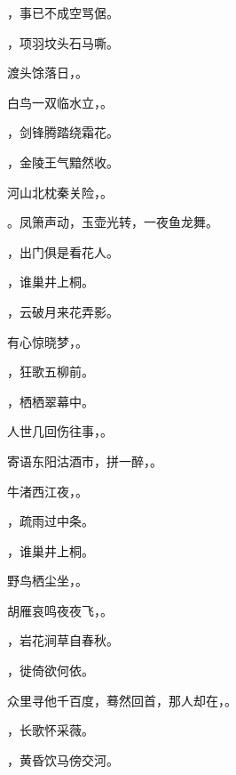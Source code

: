 \documentclass[12pt, a4paper, addpoints]{exam}
\begin{document}
\begin{questions}
\question[1] \uline{\qquad\qquad\qquad}，事已不成空骂倨。

\question[1] \uline{\qquad\qquad\qquad}，项羽坟头石马嘶。

\question[1] 渡头馀落日，\uline{\qquad\qquad\qquad}。

\question[1] 白鸟一双临水立，\uline{\qquad\qquad\qquad}。

\question[1] \uline{\qquad\qquad\qquad}，剑锋腾踏绕霜花。

\question[1] \uline{\qquad\qquad\qquad}，金陵王气黯然收。

\question[1] 河山北枕秦关险，\uline{\qquad\qquad\qquad}。

\question[1] \uline{\qquad\qquad\qquad}。凤箫声动，玉壶光转，一夜鱼龙舞。

\question[1] \uline{\qquad\qquad\qquad}，出门俱是看花人。

\question[1] \uline{\qquad\qquad\qquad}，谁巢井上桐。

\question[1] \uline{\qquad\qquad\qquad}，云破月来花弄影。

\question[1] 有心惊晓梦，\uline{\qquad\qquad\qquad}。

\question[1] \uline{\qquad\qquad\qquad}，狂歌五柳前。

\question[1] \uline{\qquad\qquad\qquad}，栖栖翠幕中。

\question[1] 人世几回伤往事，\uline{\qquad\qquad\qquad}。

\question[1] 寄语东阳沽酒市，拼一醉，\uline{\qquad\qquad\qquad}。

\question[1] 牛渚西江夜，\uline{\qquad\qquad\qquad}。

\question[1] \uline{\qquad\qquad\qquad}，疏雨过中条。

\question[1] \uline{\qquad\qquad\qquad}，谁巢井上桐。

\question[1] 野鸟栖尘坐，\uline{\qquad\qquad\qquad}。

\question[1] 胡雁哀鸣夜夜飞，\uline{\qquad\qquad\qquad}。

\question[1] \uline{\qquad\qquad\qquad}，岩花涧草自春秋。

\question[1] \uline{\qquad\qquad\qquad}，徙倚欲何依。

\question[1] 众里寻他千百度，蓦然回首，那人却在，\uline{\qquad\qquad\qquad}。

\question[1] \uline{\qquad\qquad\qquad}，长歌怀采薇。

\question[1] \uline{\qquad\qquad\qquad}，黄昏饮马傍交河。


\end{questions}
\end{document}
